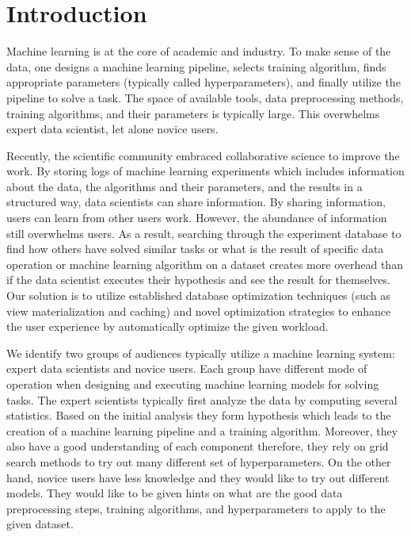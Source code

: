 \section{Introduction} \label{sec-introduction}
Machine learning is at the core of academic and industry.
To make sense of the data, one designs a machine learning pipeline, selects training algorithm, finds appropriate parameters (typically called hyperparameters), and finally utilize the pipeline to solve a task.
The space of available tools, data preprocessing methods, training algorithms, and their parameters is typically large.
This overwhelms expert data scientist, let alone novice users.

Recently, the scientific community embraced collaborative science to improve the work.
By storing logs of machine learning experiments which includes information about the data, the algorithms and their parameters, and the results in a structured way, data scientists can share information.
By sharing information, users can learn from other users work.
However, the abundance of information still overwhelms users.
As a result, searching through the experiment database to find how others have solved similar tasks or what is the result of specific data operation or machine learning algorithm on a dataset creates more overhead than if the data scientist executes their hypothesis and see the result for themselves.
Our solution is to utilize established database optimization techniques (such as view materialization and caching) and novel optimization strategies to enhance the user experience by automatically optimize the given workload.

We identify two groups of audiences typically utilize a machine learning system: expert data scientists and novice users.
Each group have different mode of operation when designing and executing machine learning models for solving tasks.
The expert scientists typically first analyze the data by computing several statistics.
Based on the initial analysis they form hypothesis which leads to the creation of a machine learning pipeline and a training algorithm.
Moreover, they also have a good understanding of each component therefore, they rely on grid search methods to try out many different set of hyperparameters.
On the other hand, novice users have less knowledge and they would like to try out different models.
They would like to be given hints on what are the good data preprocessing steps, training algorithms, and hyperparameters to apply to the given dataset.

